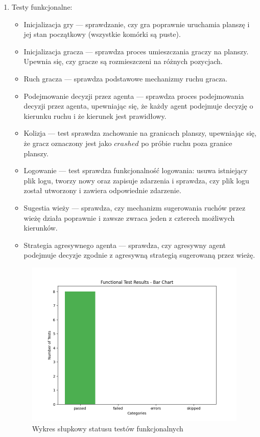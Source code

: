 \documentclass[12pt,a4paper]{article}
\begin{document}
\begin{enumerate}
    \item Testy funkcjonalne:
        \begin{itemize}
            \item Inicjalizacja gry --- sprawdzanie, czy gra poprawnie uruchamia planszę i jej stan początkowy (wszystkie komórki są puste).
            \item Inicjalizacja gracza --- sprawdza proces umieszczania graczy na planszy. Upewnia się, czy gracze są rozmieszczeni na różnych pozycjach.
            \item Ruch gracza --- sprawdza podstawowe mechanizmy ruchu gracza.
            \item Podejmowanie decyzji przez agenta --- sprawdza proces podejmowania decyzji przez agenta, upewniając się, że każdy agent podejmuje decyzję o kierunku ruchu i że kierunek jest prawidłowy.
            \item Kolizja --- test sprawdza zachowanie na granicach planszy, upewniając się, że gracz oznaczony jest jako $crashed$ po próbie ruchu poza granice planszy.
            \item Logowanie --- test sprawdza funkcjonalność logowania: usuwa istniejący plik logu, tworzy nowy oraz zapisuje zdarzenia i sprawdza, czy plik logu został utworzony i zawiera odpowiednie zdarzenie.
            \item Sugestia wieży --- sprawdza, czy mechanizm sugerowania ruchów przez wieżę działa poprawnie i zawsze zwraca jeden z czterech możliwych kierunków.
            \item Strategia agresywnego agenta --- sprawdza, czy agresywny agent podejmuje decyzje zgodnie z agresywną strategią sugerowaną przez wieżę. 
        \end{itemize}

        \begin{figure}[H]
            \centering
                \includegraphics[width=0.8\linewidth]{media/wykresy/bar_functional_test.png}
            \caption{Wykres słupkowy statusu testów funkcjonalnych}
            \label{fig:enter-label}
        \end{figure}


\end{enumerate}
\end{document}
